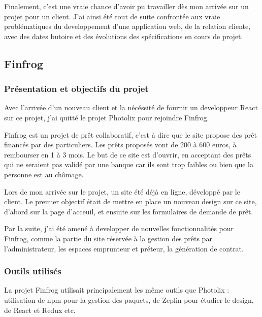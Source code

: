 \bigskip

Finalement, c'est une vraie chance d'avoir pu travailler dès mon arrivée
sur un projet pour un client. J'ai ainsi été tout de suite confrontée
aux vraie problématiques du developpement d'une application web, de la
relation cliente, avec des dates butoire et des évolutions des
spécifications en cours de projet.

\subsection{Finfrog}\label{finfrog}

\subsubsection{Présentation et objectifs du
projet}\label{pruxe9sentation-et-objectifs-du-projet-1}

\bigskip

Avec l'arrivée d'un nouveau client et la nécéssité de fournir un
developpeur React sur ce projet, j'ai quitté le projet Photolix pour
rejoindre Finfrog.

\bigskip

Finfrog est un projet de prêt collaboratif, c'est à dire que le site
propose des prêt financés par des particuliers. Les prêts proposés vont
de 200 à 600 euros, à rembourser en 1 à 3 mois. Le but de ce site est
d'ouvrir, en acceptant des prêts qui ne seraient pas validé par une
banque car ils sont trop faibles ou bien que la personne est au chômage.

\bigskip

Lors de mon arrivée sur le projet, un site été déjà en ligne, développé
par le client. Le premier objectif était de mettre en place un nouveau
design sur ce site, d'abord sur la page d'acceuil, et ensuite sur les
formulaires de demande de prêt.

\bigskip

Par la suite, j'ai été amené à developper de nouvelles fonctionnalités
pour Finfrog, comme la partie du site réservée à la gestion des prêts
par l'administrateur, les espaces emprunteur et préteur, la génération
de contrat.

\subsubsection{Outils utilisés}\label{outils-utilisuxe9s-1}

\bigskip

La projet Finfrog utilisait principalement les même outils que Photolix
: utilisation de npm pour la gestion des paquets, de Zeplin pour étudier
le design, de React et Redux etc.

